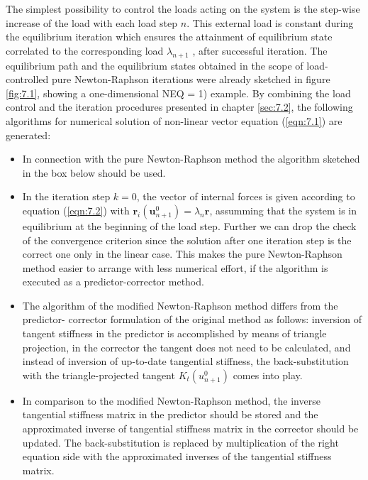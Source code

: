 The simplest possibility to control the loads acting on the system is the step-wise increase of the load with each load step $n$. This external load is constant during the equilibrium iteration which ensures the attainment of equilibrium state correlated to the corresponding load $\lambda_ {n+1}$ , after successful iteration. The equilibrium path and the equilibrium states obtained in the scope of
load-controlled pure Newton-Raphson iterations were already sketched in figure \ref{fig:7.1}, showing a
one-dimensional NEQ = 1) example. By combining the load control and the iteration procedures
presented in chapter \ref{sec:7.2}, the following algorithms for numerical solution of non-linear vector
equation (\ref{eqn:7.1}) are generated:
\begin{itemize}
    \item In connection with the pure Newton-Raphson method the algorithm sketched in the
box below should be used.
\item In the iteration step $k = 0$, the vector of internal forces is given according to equation (\ref{eqn:7.2}) with $ \boldsymbol{r}_{i}\left(\boldsymbol{u}_{n+1}^{0}\right)=\lambda_{n} \boldsymbol{r} $, assumming that the system is in equilibrium at the beginning of the
load step. Further we can drop the check of the convergence criterion since the solution
after one iteration step is the correct one only in the linear case. This makes the pure
Newton-Raphson method easier to arrange with less numerical effort, if the algorithm
is executed as a predictor-corrector method.
\item The algorithm of the modified Newton-Raphson method differs from the predictor-
corrector formulation of the original method as follows: inversion of tangent stiffness in
the predictor is accomplished by means of triangle projection, in the corrector the tangent
does not need to be calculated, and instead of inversion of up-to-date tangential stiffness,
the back-substitution with the triangle-projected tangent $K_t (u^0_{n+1} ) $ comes into play.
\item In comparison to the modified Newton-Raphson method, the inverse tangential stiffness matrix in
the predictor should be stored and the approximated inverse of tangential stiffness matrix
in the corrector should be updated. The back-substitution is replaced by multiplication of the right equation side with the approximated inverses of the tangential stiffness matrix.

\end{itemize}

